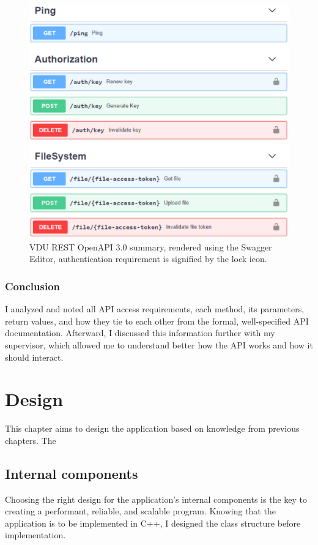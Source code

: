 \begin{figure}[htb]
	\centering
	\includegraphics[width=\columnwidth]{obrazky-figures/swagger_result.pdf}
	\caption{VDU REST OpenAPI 3.0 summary, rendered using the Swagger Editor, authentication requirement is signified by the lock icon.}
	\label{swagger_result}
\end{figure}

\subsection{Conclusion}
I analyzed and noted all API access requirements, each method, its parameters, return values, and how they tie to each other from the formal, well-specified API documentation. Afterward, I discussed this information further with my supervisor, which allowed me to understand better how the API works and how it should interact.

\chapter{Design}
\label{ch_design}
This chapter aims to design the application based on knowledge from previous chapters. The 
\section{Internal components}
Choosing the right design for the application's internal components is the key to creating a performant, reliable, and scalable program. Knowing that the application is to be implemented in C++, I designed the class structure before implementation.

